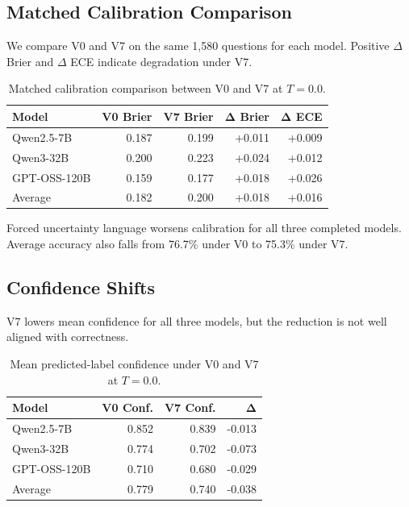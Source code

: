 \documentclass[11pt]{article}
\begin{document}
\subsection{Matched Calibration Comparison}

We compare V0 and V7 on the same 1,580 questions for each model.
Positive $\Delta$ Brier and $\Delta$ ECE indicate degradation under V7.

\begin{table}[h]
\centering
\small
\begin{tabular}{lrrrr}
\toprule
\textbf{Model} & \textbf{V0 Brier} & \textbf{V7 Brier} & $\boldsymbol{\Delta}$ \textbf{Brier} & $\boldsymbol{\Delta}$ \textbf{ECE} \\
\midrule
Qwen2.5-7B & 0.187 & 0.199 & +0.011 & +0.009 \\
Qwen3-32B & 0.200 & 0.223 & +0.024 & +0.012 \\
GPT-OSS-120B & 0.159 & 0.177 & +0.018 & +0.026 \\
\midrule
Average & 0.182 & 0.200 & +0.018 & +0.016 \\
\bottomrule
\end{tabular}
\caption{Matched calibration comparison between V0 and V7 at $T=0.0$.}
\label{tab:calibration-matched}
\end{table}

Forced uncertainty language worsens calibration for all three completed models.
Average accuracy also falls from 76.7\% under V0 to 75.3\% under V7.

\subsection{Confidence Shifts}

V7 lowers mean confidence for all three models, but the reduction is not well aligned with correctness.

\begin{table}[h]
\centering
\small
\begin{tabular}{lrrr}
\toprule
\textbf{Model} & \textbf{V0 Conf.} & \textbf{V7 Conf.} & $\boldsymbol{\Delta}$ \\
\midrule
Qwen2.5-7B & 0.852 & 0.839 & -0.013 \\
Qwen3-32B & 0.774 & 0.702 & -0.073 \\
GPT-OSS-120B & 0.710 & 0.680 & -0.029 \\
\midrule
Average & 0.779 & 0.740 & -0.038 \\
\bottomrule
\end{tabular}
\caption{Mean predicted-label confidence under V0 and V7 at $T=0.0$.}
\label{tab:confidence-shifts}
\end{table}
\end{document}

